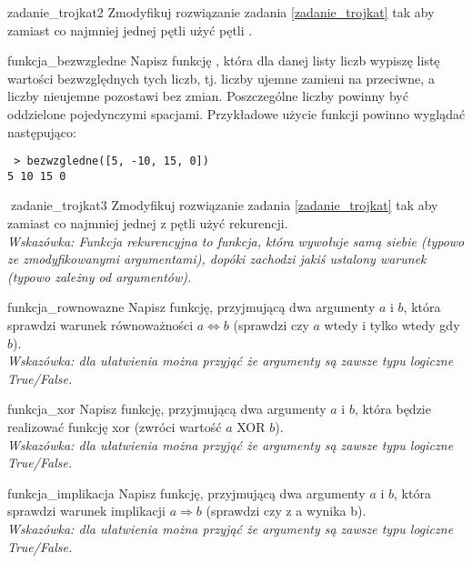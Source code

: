 \documentclass{pdfBooklets}
\begin{document}
\begin{Zadanie}{}{zadanie_trojkat2}
Zmodyfikuj rozwiązanie zadania \ref{zadanie_trojkat} tak aby zamiast co najmniej jednej pętli  użyć pętli .
\end{Zadanie}

\begin{Zadanie}{}{funkcja_bezwzgledne}
Napisz funkcję , która dla danej listy liczb wypiszę listę wartości bezwzględnych
tych liczb, tj. liczby ujemne zamieni na przeciwne, a liczby nieujemne pozostawi bez zmian.
Poszczególne liczby powinny być oddzielone pojedynczymi spacjami.
Przykładowe użycie funkcji powinno wyglądać następująco:
\begin{Verbatim}
 > bezwzgledne([5, -10, 15, 0])
5 10 15 0
\end{Verbatim}
\end{Zadanie}

\begin{Zadanie}{ {\Symbola 🤔}}{zadanie_trojkat3}
Zmodyfikuj rozwiązanie zadania \ref{zadanie_trojkat} tak aby zamiast co najmniej jednej z pętli użyć rekurencji.\\
\emph{Wskazówka: Funkcja rekurencyjna to funkcja, która wywołuje samą siebie (typowo ze zmodyfikowanymi argumentami), dopóki zachodzi jakiś ustalony warunek (typowo zależny od argumentów).}
\end{Zadanie}


\begin{Zadanie}{}{funkcja_rownowazne}
Napisz funkcję, przyjmującą dwa argumenty $a$ i $b$, która sprawdzi warunek równoważności $a \Leftrightarrow b$ (sprawdzi czy $a$ wtedy i tylko wtedy gdy $b$).
\\\emph{Wskazówka: dla ułatwienia można przyjąć że argumenty są zawsze typu logiczne True/False.}
\end{Zadanie}

\begin{Zadanie}{}{funkcja_xor}
Napisz funkcję, przyjmującą dwa argumenty $a$ i $b$, która będzie realizować funkcję xor (zwróci wartość $a$ XOR $b$).
\\\emph{Wskazówka: dla ułatwienia można przyjąć że argumenty są zawsze typu logiczne True/False.}
\end{Zadanie}

\begin{Zadanie}{}{funkcja_implikacja}
Napisz funkcję, przyjmującą dwa argumenty $a$ i $b$, która sprawdzi warunek implikacji $a \Rightarrow b$ (sprawdzi czy z a wynika b).
\\\emph{Wskazówka: dla ułatwienia można przyjąć że argumenty są zawsze typu logiczne True/False.}
\end{Zadanie}
\end{document}
